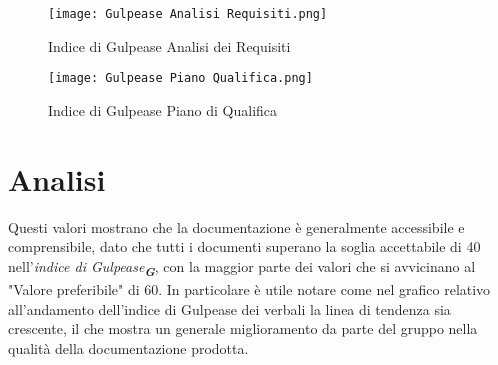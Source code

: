 \begin{figure}[H]
    \centering

    \begin{minipage}{.4\textwidth}
        \centering
        \texttt{[image: Gulpease Analisi Requisiti.png]}
        \caption{}{Indice di Gulpease Analisi dei Requisiti}
        \label{fig:Gulpease Analisi Requisiti}
    \end{minipage}%
    \begin{minipage}{.4\textwidth}
        \centering
        \texttt{[image: Gulpease Piano Qualifica.png]}
        \caption{}{Indice di Gulpease Piano di Qualifica}
        \label{fig:Gulpease Piano Qualifica}
    \end{minipage}

\end{figure}

\section*{Analisi}

Questi valori mostrano che la documentazione è generalmente accessibile e comprensibile, 
dato che tutti i documenti superano la soglia accettabile di 40 nell'\emph{indice di Gulpease}\textsubscript{\textbf{\textit{G}}}, 
con la maggior parte dei valori che si avvicinano al "Valore preferibile" di 60. 
In particolare è utile notare come nel grafico relativo all'andamento dell'indice di Gulpease dei verbali la linea di tendenza sia crescente,
il che mostra un generale miglioramento da parte del gruppo nella qualità della documentazione prodotta.